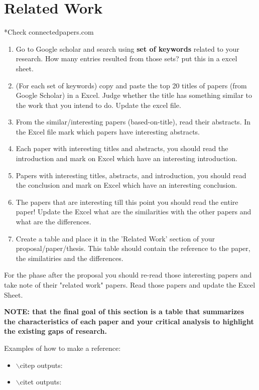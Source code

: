 \section{Related Work}

*Check connectedpapers.com

\begin{enumerate}
\item Go to Google scholar and search using \textbf{set of keywords} related to your research. How many entries resulted from those sets? put this in a excel sheet.
\item (For each set of keywords) copy and paste the top 20 titles of papers (from Google Scholar) in a Excel. Judge whether the title has something similar to the work that you intend to do. Update the excel file.
\item From the similar/interesting papers (based-on-title), read their abstracts. In the Excel file mark which papers have interesting abstracts. 
\item Each paper with interesting titles and abstracts, you should read the introduction and mark on Excel which have an interesting introduction.
\item Papers with interesting titles, abstracts, and introduction, you should read the conclusion and mark on Excel which have an interesting conclusion.
\item The papers that are interesting till this point you should read the entire paper! Update the Excel what are the similarities with the other papers and what are the differences.
\item Create a table and place it in the 'Related Work' section of your proposal/paper/thesis. This table should contain the reference to the paper, the similatiries and the differences. 
\end{enumerate}

For the phase after the proposal you should re-read those interesting papers and take note of their "related work" papers. Read those papers and update the Excel Sheet.

\textbf{NOTE: that the final goal of this section is a table that summarizes the characteristics of each paper and your critical analysis to highlight the existing gaps of research.}

Examples of how to make a reference:
\begin{itemize}
	\item $\backslash$citep outputs: \citep{jjsantanna2015IM1}
	\item $\backslash$citet outputs: \citet{jjsantanna2015IM1}
\end{itemize}

